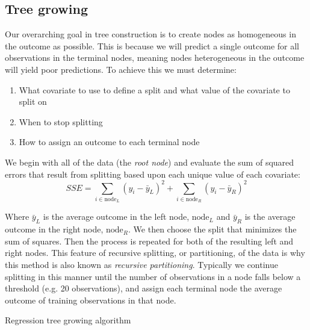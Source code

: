 \documentclass[12pt]{article}
\begin{document}

\subsection{Tree growing} %
\label{sub:tree_growing}

Our overarching goal in tree construction is to create nodes as homogeneous in the outcome as possible. This is because we will predict a single outcome for all observations in the terminal nodes, meaning nodes heterogeneous in the outcome will yield poor predictions. To achieve this we must determine:

\begin{enumerate}
  \item What covariate to use to define a split and what value of the covariate to split on
  \item When to stop splitting
  \item How to assign an outcome to each terminal node
\end{enumerate}

We begin with all of the data (the \emph{root node}) and evaluate the sum of squared errors that result from splitting based upon each unique value of each covariate:
\begin{equation}
  SSE = \sum_{i \in \text{node}_{L}} (y_{i} - \bar{y}_{L})^2 + \sum_{i \in \text{node}_{R}} (y_{i} - \bar{y}_{R})^2
\end{equation}

Where $\bar{y}_{L}$ is the average outcome in the left node, $\text{node}_{L}$ and $\bar{y}_{R}$ is the average outcome in the right node, $\text{node}_{R}$. We then choose the split that minimizes the sum of squares. Then the process is repeated for both of the resulting left and right nodes. This feature of recursive splitting, or partitioning, of the data is why this method is also known as \emph{recursive partitioning}. Typically we continue splitting in this manner until the number of observations in a node falls below a threshold (e.g. 20 observations), and assign each terminal node the average outcome of training observations in that node.

\begin{algorithm}[ht]
 \caption{Regression tree growing algorithm}
\end{algorithm}
\end{document}
